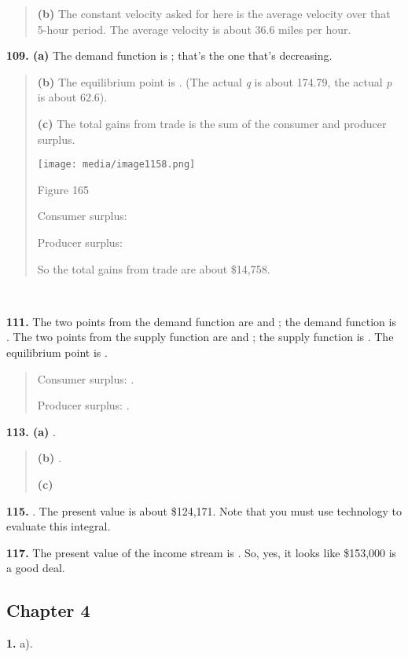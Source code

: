 \begin{quote}
\textbf{(b)} The constant velocity asked for here is the average
velocity over that 5-hour period. The average velocity is about 36.6
miles per hour.
\end{quote}

\textbf{109. (a)} The demand function is ; that's the one that's
decreasing.

\begin{quote}
\textbf{(b)} The equilibrium point is . (The actual \emph{q} is about
174.79, the actual \emph{p} is about 62.6).

\textbf{(c)} The total gains from trade is the sum of the consumer and
producer surplus.

\texttt{[image: media/image1158.png]}

Figure 165

Consumer surplus:

Producer surplus:

So the total gains from trade are about \$14,758.
\end{quote}

\textbf{\\
}

\textbf{111.} The two points from the demand function are and ; the
demand function is . The two points from the supply function are and ;
the supply function is . The equilibrium point is .

\begin{quote}
Consumer surplus: .

Producer surplus: .
\end{quote}

\textbf{113. (a)} .

\begin{quote}
\textbf{(b)} .

\textbf{(c)}
\end{quote}

\textbf{115.} . The present value is about \$124,171. Note that you must
use technology to evaluate this integral.

\textbf{117.} The present value of the income stream is . So, yes, it
looks like \$153,000 is a good deal.

\hypertarget{chapter-4}{\subsection{Chapter 4}\label{chapter-4}}

\textbf{1.} a).

